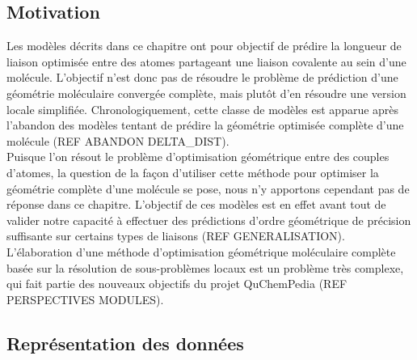 \subsection{Motivation}

Les modèles décrits dans ce chapitre ont pour objectif de prédire la longueur de liaison optimisée entre des atomes partageant une liaison covalente au sein d'une molécule. L'objectif n'est donc pas de résoudre le problème de prédiction d'une géométrie moléculaire convergée complète, mais plutôt d'en résoudre une version locale simplifiée. Chronologiquement, cette classe de modèles est apparue après l'abandon des modèles tentant de prédire la géométrie optimisée complète d'une molécule (REF ABANDON DELTA\_DIST).\\
Puisque l'on résout le problème d'optimisation géométrique entre des couples d'atomes, la question de la façon d'utiliser cette méthode pour optimiser la géométrie complète d'une molécule se pose, nous n'y apportons cependant pas de réponse dans ce chapitre. L'objectif de ces modèles est en effet avant tout de valider notre capacité à effectuer des prédictions d'ordre géométrique de précision suffisante sur certains types de liaisons (REF GENERALISATION). L'élaboration d'une méthode d'optimisation géométrique moléculaire complète basée sur la résolution de sous-problèmes locaux est un problème très complexe, qui fait partie des nouveaux objectifs du projet QuChemPedia (REF PERSPECTIVES MODULES).

\subsection{Représentation des données}

